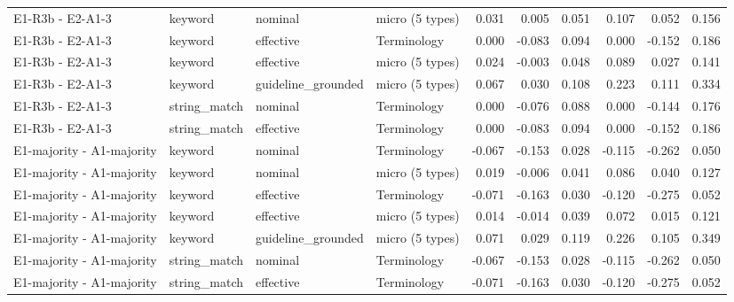 \begin{table}[t]
\begin{tabular}{llllrrrrrr}
E1-R3b - E2-A1-3 & keyword & nominal & micro (5 types) & 0.031 & 0.005 & 0.051 & 0.107 & 0.052 & 0.156 \\
E1-R3b - E2-A1-3 & keyword & effective & Terminology & 0.000 & -0.083 & 0.094 & 0.000 & -0.152 & 0.186 \\
E1-R3b - E2-A1-3 & keyword & effective & micro (5 types) & 0.024 & -0.003 & 0.048 & 0.089 & 0.027 & 0.141 \\
E1-R3b - E2-A1-3 & keyword & guideline\_grounded & micro (5 types) & 0.067 & 0.030 & 0.108 & 0.223 & 0.111 & 0.334 \\
E1-R3b - E2-A1-3 & string\_match & nominal & Terminology & 0.000 & -0.076 & 0.088 & 0.000 & -0.144 & 0.176 \\
E1-R3b - E2-A1-3 & string\_match & effective & Terminology & 0.000 & -0.083 & 0.094 & 0.000 & -0.152 & 0.186 \\
E1-majority - A1-majority & keyword & nominal & Terminology & -0.067 & -0.153 & 0.028 & -0.115 & -0.262 & 0.050 \\
E1-majority - A1-majority & keyword & nominal & micro (5 types) & 0.019 & -0.006 & 0.041 & 0.086 & 0.040 & 0.127 \\
E1-majority - A1-majority & keyword & effective & Terminology & -0.071 & -0.163 & 0.030 & -0.120 & -0.275 & 0.052 \\
E1-majority - A1-majority & keyword & effective & micro (5 types) & 0.014 & -0.014 & 0.039 & 0.072 & 0.015 & 0.121 \\
E1-majority - A1-majority & keyword & guideline\_grounded & micro (5 types) & 0.071 & 0.029 & 0.119 & 0.226 & 0.105 & 0.349 \\
E1-majority - A1-majority & string\_match & nominal & Terminology & -0.067 & -0.153 & 0.028 & -0.115 & -0.262 & 0.050 \\
E1-majority - A1-majority & string\_match & effective & Terminology & -0.071 & -0.163 & 0.030 & -0.120 & -0.275 & 0.052 \\
\bottomrule
\end{tabular}
\end{table}
